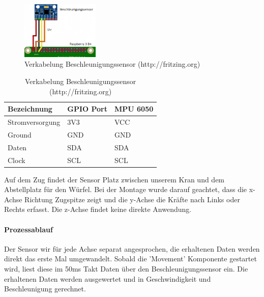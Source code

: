 \documentclass[../../main.tex]{subfiles}
\begin{document}
\begin{table}[H]
  \begin{figure}[H] \centering
    \includegraphics[width=0.33\textwidth]{Verkabelung_BeschlSensor}
    \caption{Verkabelung Beschleunigungssensor (http://fritzing.org)}
    \label{fig:Beschleunigungssensor}
  \end{figure}
  \begin{center}
  \begin{tabular}{lll}
  Bezeichnung     & GPIO Port & MPU 6050 \\ \hline
  Stromversorgung & 3V3      & VCC      \\ \hline
  Ground          & GND      & GND      \\ \hline
  Daten          & SDA      & SDA       \\ \hline
  Clock          & SCL      & SCL       \\ \hline
  \end{tabular}
  \end{center}
\end{table}

Auf dem Zug findet der Sensor Platz zwischen unserem Kran und dem Abstellplatz für den Würfel. Bei der Montage wurde darauf geachtet, dass die x-Achse Richtung Zugspitze zeigt und die y-Achse die Kräfte nach Links oder Rechts erfasst. Die z-Achse findet keine direkte Anwendung.

\paragraph{Prozessablauf}
Der Sensor wir für jede Achse separat angesprochen, die erhaltenen Daten werden direkt das erste Mal umgewandelt. Sobald die 'Movement' Komponente gestartet wird, liest diese im 50ms Takt Daten über den Beschleunigungssensor ein. Die erhaltenen Daten werden ausgewertet und in Geschwindigkeit und Beschleunigung gerechnet.
\end{document}
